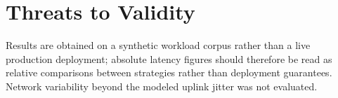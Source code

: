 \section{Threats to Validity}

Results are obtained on a synthetic workload corpus rather than a live
production deployment; absolute latency figures should therefore be read
as relative comparisons between strategies rather than deployment
guarantees. Network variability beyond the modeled uplink jitter was not
evaluated.
